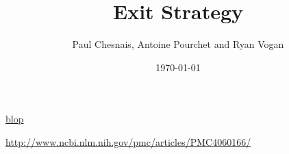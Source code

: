 \documentclass{article}
\title{Exit Strategy}
\author{Paul Chesnais, Antoine Pourchet and Ryan Vogan}
\date{\today}
\begin{document}
\maketitle
\thispagestyle{empty}

\href{http://paul.chesnais.com/assets/favicon.png}{blop}

\begin{thebibliography}{9}
    \url{http://www.ncbi.nlm.nih.gov/pmc/articles/PMC4060166/}
\end{thebibliography}
\end{document}

